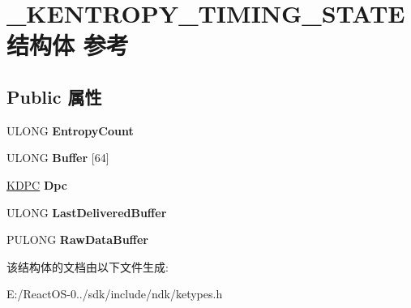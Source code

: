 \hypertarget{struct___k_e_n_t_r_o_p_y___t_i_m_i_n_g___s_t_a_t_e}{}\section{\+\_\+\+K\+E\+N\+T\+R\+O\+P\+Y\+\_\+\+T\+I\+M\+I\+N\+G\+\_\+\+S\+T\+A\+T\+E结构体 参考}
\label{struct___k_e_n_t_r_o_p_y___t_i_m_i_n_g___s_t_a_t_e}
\subsection*{Public 属性}
\begin{DoxyCompactItemize}
\item 
\mbox{\label{struct___k_e_n_t_r_o_p_y___t_i_m_i_n_g___s_t_a_t_e_a240394e802256f01ae717f24acb20885}} 
U\+L\+O\+NG {\bfseries Entropy\+Count}
\item 
\mbox{\label{struct___k_e_n_t_r_o_p_y___t_i_m_i_n_g___s_t_a_t_e_a34e537d7bb671a50776068b500f3a171}} 
U\+L\+O\+NG {\bfseries Buffer} \mbox{[}64\mbox{]}
\item 
\mbox{\label{struct___k_e_n_t_r_o_p_y___t_i_m_i_n_g___s_t_a_t_e_ae8df3a77dc9555930e126441be75b18c}} 
\hyperlink{struct___k_d_p_c}{K\+D\+PC} {\bfseries Dpc}
\item 
\mbox{\label{struct___k_e_n_t_r_o_p_y___t_i_m_i_n_g___s_t_a_t_e_a24415c9940a81a9a54d7bf1e58e085e2}} 
U\+L\+O\+NG {\bfseries Last\+Delivered\+Buffer}
\item 
\mbox{\label{struct___k_e_n_t_r_o_p_y___t_i_m_i_n_g___s_t_a_t_e_a5a61fbe578002b9353c84a2eeb3cb780}} 
P\+U\+L\+O\+NG {\bfseries Raw\+Data\+Buffer}
\end{DoxyCompactItemize}


该结构体的文档由以下文件生成\+:\begin{DoxyCompactItemize}
\item 
E\+:/\+React\+O\+S-\/0../sdk/include/ndk/ketypes.\+h\end{DoxyCompactItemize}
